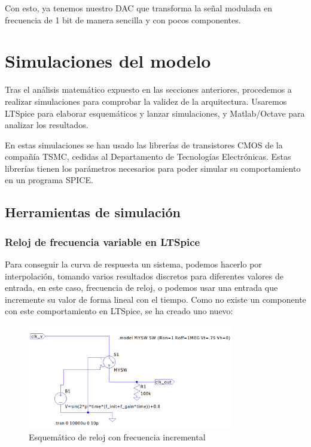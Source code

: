 \documentclass[12pt]{report} %
\begin{document}
	Con esto, ya tenemos nuestro DAC que transforma la señal modulada en frecuencia de 1 bit de manera sencilla y con pocos componentes.
	
	\section{Simulaciones del modelo}
	
	Tras el análisis matemático expuesto en las secciones anteriores, procedemos a realizar simulaciones para comprobar la validez de la arquitectura. Usaremos LTSpice para elaborar esquemáticos y lanzar simulaciones, y Matlab/Octave para analizar los resultados.
	
	En estas simulaciones se han usado las librerías de transistores CMOS de la compañía TSMC, cedidas al Departamento de Tecnologías Electrónicas. Estas librerías tienen los parámetros necesarios para poder simular su comportamiento en un programa SPICE.
	
	\subsection{Herramientas de simulación}
	
	\subsubsection{Reloj de frecuencia variable en LTSpice}
	Para conseguir la curva de respuesta un sistema, podemos hacerlo por interpolación, tomando varios resultados discretos para diferentes valores de entrada, en este caso, frecuencia de reloj, o podemos usar una entrada que incremente su valor de forma lineal con el tiempo. Como no existe un componente con este comportamiento en LTSpice, se ha creado uno nuevo:
	
	\begin{figure}[H]
		\includegraphics[width=0.8\textwidth]{ltspice-clk-freq.png}
		\caption[Esquemático de reloj con frecuencia incremental]{Esquemático de reloj con frecuencia incremental}
		\label{fig:ltspice-clk-freq.png}
	\end{figure}
	
\end{document}
